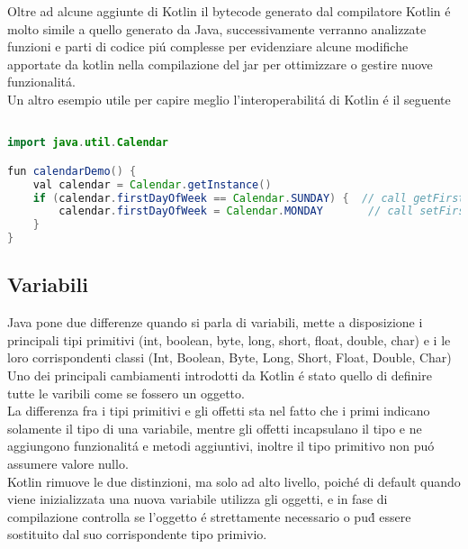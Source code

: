 %
%
%
%


Oltre ad alcune aggiunte di Kotlin il bytecode generato dal compilatore Kotlin \'e molto simile a quello generato da Java, successivamente verranno analizzate
funzioni e parti di codice pi\'u complesse per evidenziare alcune modifiche apportate da kotlin nella compilazione del jar per ottimizzare o gestire nuove funzionalit\'a.\\
Un altro esempio utile per capire meglio l'interoperabilit\'a di Kotlin \'e il seguente


\begin{lstlisting}[language=java,caption={Esempio}]

import java.util.Calendar

fun calendarDemo() {
    val calendar = Calendar.getInstance()
    if (calendar.firstDayOfWeek == Calendar.SUNDAY) {  // call getFirstDayOfWeek()
        calendar.firstDayOfWeek = Calendar.MONDAY       // call setFirstDayOfWeek()
    }
}
\end{lstlisting}


\subsection{Variabili}
Java pone due differenze quando si parla di variabili, mette a disposizione i principali tipi primitivi (int, boolean, byte, long, short, float, double, char) e i le loro corrispondenti classi (Int, Boolean, Byte, Long, Short, Float, Double, Char)
Uno dei principali cambiamenti introdotti da Kotlin \'e stato quello di definire tutte le varibili come se fossero un oggetto.\\
La differenza fra i tipi primitivi e gli offetti sta nel fatto che i primi indicano solamente il tipo di una variabile, mentre gli offetti incapsulano il tipo e ne aggiungono funzionalit\'a e metodi aggiuntivi, inoltre il tipo primitivo non pu\'o assumere valore nullo. \\
Kotlin rimuove le due distinzioni, ma solo ad alto livello, poich\'e di default quando viene inizializzata una nuova variabile utilizza gli oggetti, e in fase di compilazione controlla se l'oggetto \'e strettamente necessario o pu\'d essere sostituito dal suo corrispondente tipo primivio.

